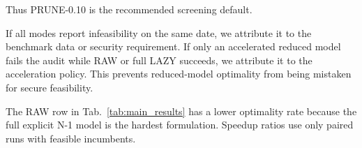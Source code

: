 \documentclass[runningheads]{llncs}
\begin{document}
Thus PRUNE-0.10 is the recommended screening default.

If all modes report infeasibility on the same date, we attribute it to the benchmark data or security requirement. If only an accelerated reduced model fails the audit while RAW or full LAZY succeeds, we attribute it to the acceleration policy. This prevents reduced-model optimality from being mistaken for secure feasibility.

\begin{table}[t]\centering
\caption{Representative speedups over RAW.}
\label{tab:main_results}
\footnotesize
\setlength{\tabcolsep}{3pt}
\end{table}

The RAW row in Tab.~\ref{tab:main_results} has a lower optimality rate because the full explicit N-1 model is the hardest formulation. Speedup ratios use only paired runs with feasible incumbents.

% 




\begin{table}[t]\centering
\caption{Constraint-reduction summary.}
\label{tab:constraint_reduction_compact}
\footnotesize
\setlength{\tabcolsep}{3pt}
\end{table}
\end{document}

